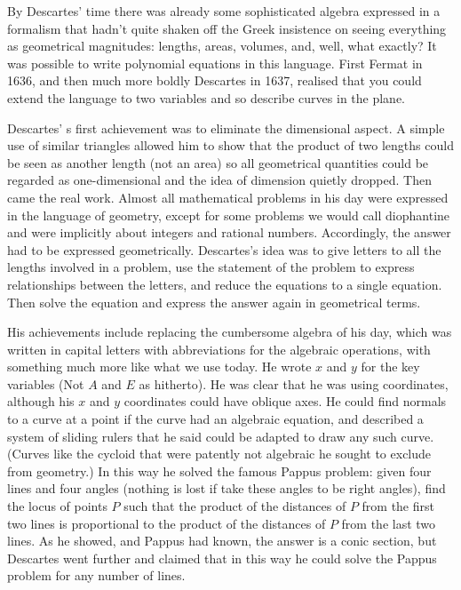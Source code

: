 \documentclass[11pt]{book}
\begin{document}
By Descartes' time there was already some sophisticated algebra expressed in a formalism that hadn't quite shaken off   the Greek insistence on seeing everything as geometrical magnitudes: lengths, areas, volumes, and, well, what exactly? It was possible to write polynomial equations in this language. First Fermat in 1636, and then much more boldly Descartes in 1637, realised that you could extend the language to two variables and so describe curves in the plane.

Descartes' s first achievement was to eliminate the dimensional aspect. A simple use of similar triangles allowed him to show that the product of two lengths could be seen as another length (not an area) so all geometrical quantities could be regarded as one-dimensional and the idea of dimension quietly dropped. Then came the real work. Almost all mathematical problems in his day were expressed in the language of geometry, except for some problems we would call diophantine and were implicitly about integers and rational numbers. Accordingly, the answer had to be expressed geometrically. Descartes's idea was to give letters to all the lengths involved in a problem, use the statement of the problem to express relationships between the letters, and reduce the equations to a single equation. Then solve the equation and express the answer again in geometrical terms.  

His achievements include replacing the cumbersome algebra of his day, which was written in capital letters with abbreviations for the algebraic operations, with something much more like   what we use today. He wrote $x$ and $y$ for the key variables (Not $A$ and $E$ as hitherto). He was clear that he was using coordinates, although his $x$ and $y$ coordinates could have oblique axes. He could find normals to a curve at a point if the curve had an algebraic equation, and described a system of sliding rulers that he said could be adapted to draw any such curve. (Curves like the cycloid that were patently not algebraic he sought to exclude from geometry.) In this way he solved the famous Pappus problem: given four lines and four angles (nothing is lost if take these angles to be right angles), find the locus of points $P$ such that the product of the distances of $P$ from the first two lines is proportional to the product of the distances of $P$ from the last two lines. As he showed, and Pappus had known, the answer is a conic section, but 
Descartes went further and claimed that in this way he could solve the Pappus problem for any number of lines. 
\end{document}
